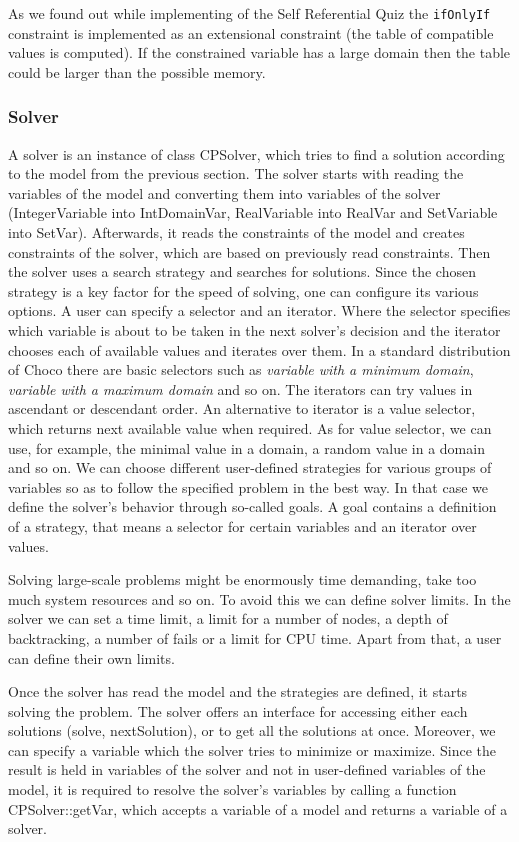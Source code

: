 As we found out while implementing of the Self Referential Quiz the \texttt{ifOnlyIf} constraint
is implemented as an extensional constraint (the table of compatible values is computed).
If the constrained variable has a large domain then the table could be larger than
the possible memory.

\subsubsection{Solver}
A solver is an instance of class CPSolver, which tries to find a solution according to the model
from the previous section. The solver starts with reading the variables of the model and 
converting them into variables of the solver (IntegerVariable into IntDomainVar, RealVariable into RealVar and SetVariable into SetVar).
Afterwards, it reads the constraints of the model and creates constraints of the solver, which are based on previously read constraints.
Then the solver uses a search strategy and searches for solutions. Since the chosen strategy
is a key factor for the speed of solving, one can configure its various options.
A user can specify a selector and an iterator. Where the selector specifies which variable
is about to be taken in the next solver's decision and the iterator chooses each of available values
and iterates over them. In a standard distribution of Choco there are basic selectors such as 
{\em variable with a minimum domain}, {\em variable with a maximum domain} and so on. 
The iterators can try values in ascendant or descendant order. An alternative to iterator
is a value selector, which returns next available value when required. As for value selector,
we can use, for example, the minimal value in a domain, a random value in a domain and so on. We can choose
different user-defined strategies for various groups of variables so as to follow the specified problem
in the best way. In that case we define the solver's behavior through so-called goals. A goal
contains a definition of a strategy, that means a selector for certain variables and an iterator over values.

Solving large-scale problems might be enormously time demanding, take too much system resources and so on.
To avoid this we can define solver limits. In the solver we can set a time limit, a limit for a number of nodes, 
a depth of backtracking, a number of fails or a limit for CPU time. Apart from that, a user can define their own limits. 

Once the solver has read the model and the strategies are defined, it starts solving the problem.
The solver offers an interface for accessing either each solutions (solve, nextSolution), or to get
all the solutions at once. Moreover, we can specify a variable which the solver tries to minimize or maximize.
Since the result is held in variables of the solver and not in user-defined variables of the model,
it is required to resolve the solver's variables by calling a function CPSolver::getVar, which accepts a variable of a model
and returns a variable of a solver.

